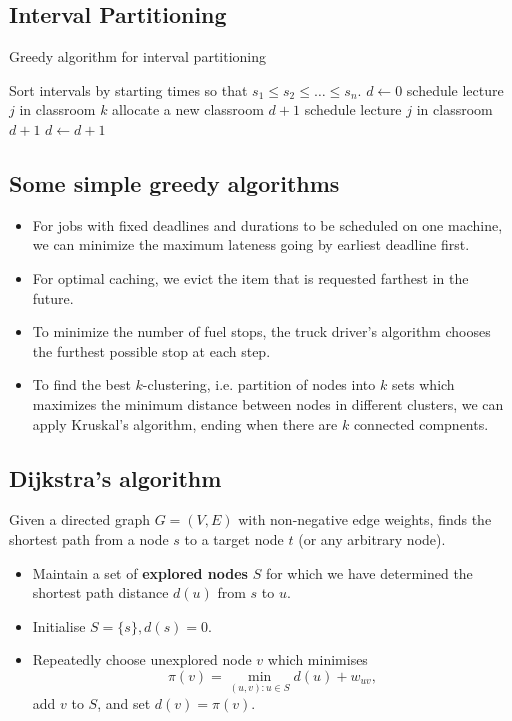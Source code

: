 \documentclass[10pt, oneside, reqno]{amsart}
\theoremstyle{plain}%
\theoremstyle{definition}
\theoremstyle{remark}
\begin{document}
\subsection{Interval Partitioning} %
\label{sub:interval_partitioning}

\begin{algorithm}[H]
	\label{alg:dynamic_rising_trend}
	\caption{Greedy algorithm for interval partitioning}
	\begin{algorithmic}[1]
			\State Sort intervals by starting times so that $s_1 \leq s_2 \leq \dots \leq s_n$.
			\State $d \gets 0$
					\State schedule lecture $j$ in classroom $k$
				\Else
					\State allocate a new classroom $d+1$
					\State schedule lecture $j$ in classroom $d+1$
					\State $d \gets d+1$
				\EndIf
			\EndFor
	\EndProcedure
	\end{algorithmic}
\end{algorithm}


\subsection{Some simple greedy algorithms} %
\begin{itemize}
\item For jobs with fixed deadlines and durations to be scheduled on one machine, we can minimize the maximum lateness going by earliest deadline first.
\item For optimal caching, we evict the item that is requested farthest in the future.
\item To minimize the number of fuel stops, the truck driver's algorithm chooses the furthest possible stop at each step.
\item To find the best $k$-clustering, i.e. partition of nodes into $k$ sets which maximizes the minimum distance between nodes in different clusters, we can apply Kruskal's algorithm, ending when there are $k$ connected compnents.
\end{itemize}
\subsection{Dijkstra's algorithm} %
\label{sub:dijkstra_s_algorithm}

Given a directed graph $G = (V,E)$ with non-negative edge weights, finds the shortest path from a node $s$ to a target node $t$ (or any arbitrary node).
\begin{itemize}
	\item Maintain a set of \textbf{explored nodes} $S$ for which we have determined the shortest path distance $d(u)$ from $s$ to $u$.
	\item Initialise $S = \{s\}, d(s) = 0$.
	\item Repeatedly choose unexplored node $v$ which minimises \[
		\pi(v) = \min_{(u,v): u \in S} d(u) + w_{uv},
	\]
	add $v$ to $S$, and set $d(v) = \pi(v)$.
\end{itemize}
\end{document}
